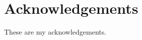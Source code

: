 
\chapter*{Acknowledgements}
\label{cha:Acknowledgements}

These are my acknowledgements.

\lipsum[1-2]
